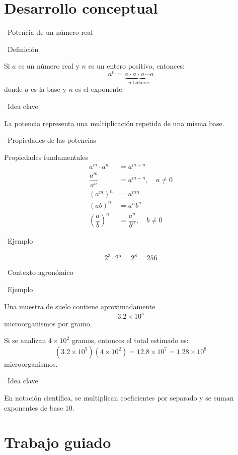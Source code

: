 \documentclass[10pt,handout,aspectratio=169]{beamer}
\newcommand{\IdeaClave}[1]{
	\begin{alertblock}{\faLightbulb\ Idea clave}
		#1
	\end{alertblock}
}
\newcommand{\Ejemplo}[1]{
	\begin{exampleblock}{\faPen\ Ejemplo}
		#1
	\end{exampleblock}
}
\newcommand{\Definicion}[1]{
	\begin{block}{\faBook\ Definición}
		#1
	\end{block}
}
\begin{document}
	\section{Desarrollo conceptual}
	
	\begin{frame}{\faBook\ Potencia de un número real}
		\Definicion{
			Si $a$ es un número real y $n$ es un entero positivo, entonces:
			\[
			a^n = \underbrace{a\cdot a\cdot a\cdots a}_{n\text{ factores}}
			\]
			donde $a$ es la base y $n$ es el exponente.
		}
		\IdeaClave{
			La potencia representa una multiplicación repetida de una misma base.
		}
	\end{frame}
	
	\begin{frame}{\faPen\ Propiedades de las potencias}
		\begin{block}{Propiedades fundamentales}
			\begin{align*}
				a^m\cdot a^n &= a^{m+n} \\
				\dfrac{a^m}{a^n} &= a^{m-n}, \quad a\neq 0 \\
				(a^m)^n &= a^{mn} \\
				(ab)^n &= a^n b^n \\
				\left(\dfrac{a}{b}\right)^n &= \dfrac{a^n}{b^n}, \quad b\neq 0
			\end{align*}
		\end{block}
		
		\Ejemplo{
			\[
			2^3\cdot 2^5 = 2^{8}=256
			\]
		}
	\end{frame}
	
	\begin{frame}{\faFlask\ Contexto agronómico}
		\Ejemplo{
			Una muestra de suelo contiene aproximadamente
			\[
			3.2\times 10^5
			\]
			microorganismos por gramo.
			
			Si se analizan $4\times 10^2$ gramos, entonces el total estimado es:
			\[
			(3.2\times 10^5)(4\times 10^2)=12.8\times 10^7=1.28\times 10^8
			\]
			microorganismos.
		}
		\IdeaClave{
			En notación científica, se multiplican coeficientes por separado y se suman exponentes de base 10.
		}
	\end{frame}
	
	\section{Trabajo guiado}
	
\end{document}
